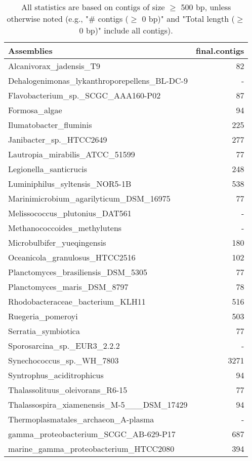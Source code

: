\documentclass[12pt,a4paper]{article}
\begin{document}
\begin{table}[ht]
\begin{center}
\caption{All statistics are based on contigs of size $\geq$ 500 bp, unless otherwise noted (e.g., "\# contigs ($\geq$ 0 bp)" and "Total length ($\geq$ 0 bp)" include all contigs).}
\begin{tabular}{|l*{1}{|r}|}
\hline
Assemblies & final.contigs \\ \hline
Alcanivorax\_jadensis\_T9 & 82 \\ \hline
Dehalogenimonas\_lykanthroporepellens\_BL-DC-9 & - \\ \hline
Flavobacterium\_sp.\_SCGC\_AAA160-P02 & 87 \\ \hline
Formosa\_algae & 94 \\ \hline
Ilumatobacter\_fluminis & 225 \\ \hline
Janibacter\_sp.\_HTCC2649 & 277 \\ \hline
Lautropia\_mirabilis\_ATCC\_51599 & 77 \\ \hline
Legionella\_santicrucis & 248 \\ \hline
Luminiphilus\_syltensis\_NOR5-1B & 538 \\ \hline
Marinimicrobium\_agarilyticum\_DSM\_16975 & 77 \\ \hline
Melissococcus\_plutonius\_DAT561 & - \\ \hline
Methanococcoides\_methylutens & - \\ \hline
Microbulbifer\_yueqingensis & 180 \\ \hline
Oceanicola\_granulosus\_HTCC2516 & 102 \\ \hline
Planctomyces\_brasiliensis\_DSM\_5305 & 77 \\ \hline
Planctomyces\_maris\_DSM\_8797 & 78 \\ \hline
Rhodobacteraceae\_bacterium\_KLH11 & 516 \\ \hline
Ruegeria\_pomeroyi & 503 \\ \hline
Serratia\_symbiotica & 77 \\ \hline
Sporosarcina\_sp.\_EUR3\_2.2.2 & - \\ \hline
Synechococcus\_sp.\_WH\_7803 & 3271 \\ \hline
Syntrophus\_aciditrophicus & 94 \\ \hline
Thalassolituus\_oleivorans\_R6-15 & 77 \\ \hline
Thalassospira\_xiamenensis\_M-5\_\_\_DSM\_17429 & 94 \\ \hline
Thermoplasmatales\_archaeon\_A-plasma & - \\ \hline
gamma\_proteobacterium\_SCGC\_AB-629-P17 & 687 \\ \hline
marine\_gamma\_proteobacterium\_HTCC2080 & 394 \\ \hline
\end{tabular}
\end{center}
\end{table}
\end{document}
